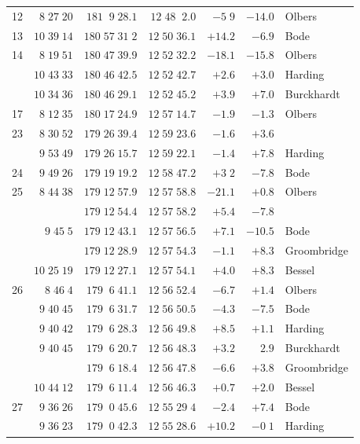\begin{longtable}{lrrrrrl}
12 & $8\;27\;20$ & $181\;\;9\;28.1$ & $12\;48\;\;2.0$ & $-5\;9$ & $-14.0$ & Olbers \\
13 & $10\;39\;14$ & $180\;57\;31\;2$ & $12\;50\;36.1$ & $+14.2$ & $-6.9$ & Bode \\
14 & $8\;19\;51$ & $180\;47\;39.9$ & $12\;52\;32.2$ & $-18.1$ & $-15.8$ & Olbers \\
 & $10\;43\;33$ & $180\;46\;42.5$ & $12\;52\;42.7$ & $+2.6$ & $+3.0$ & Harding \\
 & $10\;34\;36$ & $180\;46\;29.1$ & $12\;52\;45.2$ & $+3.9$ & $+7.0$ & Burckhardt \\
17 & $8\;12\;35$ & $180\;17\;24.9$ & $12\;57\;14.7$ & $-1.9$ & $-1.3$ & Olbers \\
23 & $8\;30\;52$ & $179\;26\;39.4$ & $12\;59\;23.6$ & $-1.6$ & $+3.6$ &  \\
 & $9\;53\;49$ & $179\;26\;15.7$ & $12\;59\;22.1$ & $-1.4$ & $+7.8$ & Harding \\
24 & $9\;49\;26$ & $179\;19\;19.2$ & $12\;58\;47.2$ & $+3\;2$ & $-7.8$ & Bode \\
25 & $8\;44\;38$ & $179\;12\;57.9$ & $12\;57\;58.8$ & $-21.1$ & $+0.8$ & Olbers \\
 &  & $179\;12\;54.4$ & $12\;57\;58.2$ & $+5.4$ & $-7.8$ &  \\
 & $9\;45\;5$ & $179\;12\;43.1$ & $12\;57\;56.5$ & $+7.1$ & $-10.5$ & Bode \\
 &  & $179\;12\;28.9$ & $12\;57\;54.3$ & $-1.1$ & $+8.3$ & Groombridge \\
 & $10\;25\;19$ & $179\;12\;27.1$ & $12\;57\;54.1$ & $+4.0$ & $+8.3$ & Bessel \\
26 & $8\;46\;4$ & $179\;\;6\;41.1$ & $12\;56\;52.4$ & $-6.7$ & $+1.4$ & Olbers \\
 & $9\;40\;45$ & $179\;\;6\;31.7$ & $12\;56\;50.5$ & $-4.3$ & $-7.5$ & Bode \\
 & $9\;40\;42$ & $179\;\;6\;28.3$ & $12\;56\;49.8$ & $+8.5$ & $+1.1$ & Harding \\
 & $9\;40\;45$ & $179\;\;6\;20.7$ & $12\;56\;48.3$ & $+3.2$ & $2.9$ & Burckhardt \\
 &  & $179\;\;6\;18.4$ & $12\;56\;47.8$ & $-6.6$ & $+3.8$ & Groombridge \\
 & $10\;44\;12$ & $179\;\;6\;11.4$ & $12\;56\;46.3$ & $+0.7$ & $+2.0$ & Bessel \\
27 & $9\;36\;26$ & $179\;\;0\;45.6$ & $12\;55\;29\;4$ & $-2.4$ & $+7.4$ & Bode \\
 & $9\;36\;23$ & $179\;\;0\;42.3$ & $12\;55\;28.6$ & $+10.2$ & $-0\;1$ & Harding \\

\end{longtable}
